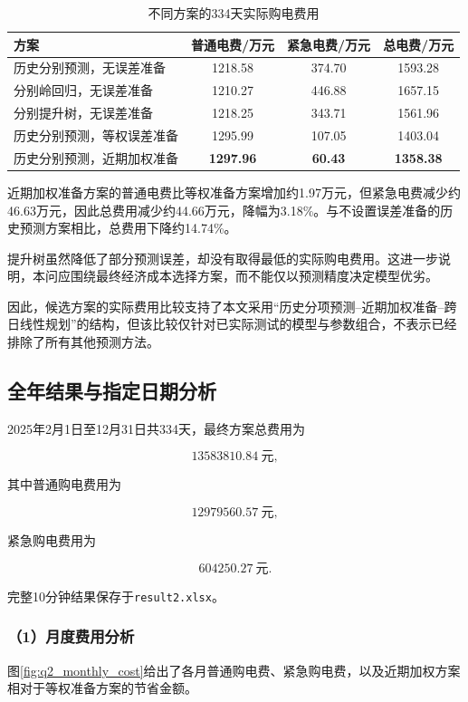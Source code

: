 \begin{table}[htbp]
\centering
\caption{不同方案的334天实际购电费用}
\label{tab:q2_model_compare}
\begin{tabular}{lccc}
\hline
方案 & 普通电费/万元 & 紧急电费/万元 & 总电费/万元 \\
\hline
历史分别预测，无误差准备
& 1218.58 & 374.70 & 1593.28 \\
分别岭回归，无误差准备
& 1210.27 & 446.88 & 1657.15 \\
分别提升树，无误差准备
& 1218.25 & 343.71 & 1561.96 \\
历史分别预测，等权误差准备
& 1295.99 & 107.05 & 1403.04 \\
历史分别预测，近期加权准备
& \textbf{1297.96} & \textbf{60.43} & \textbf{1358.38} \\
\hline
\end{tabular}
\end{table}

近期加权准备方案的普通电费比等权准备方案增加约1.97万元，但紧急电费减少约46.63万元，因此总费用减少约44.66万元，降幅为3.18\%。与不设置误差准备的历史预测方案相比，总费用下降约14.74\%。

提升树虽然降低了部分预测误差，却没有取得最低的实际购电费用。这进一步说明，本问应围绕最终经济成本选择方案，而不能仅以预测精度决定模型优劣。

因此，候选方案的实际费用比较支持了本文采用“历史分项预测--近期加权准备--跨日线性规划”的结构，但该比较仅针对已实际测试的模型与参数组合，不表示已经排除了所有其他预测方法。


\subsection{全年结果与指定日期分析}

2025年2月1日至12月31日共334天，最终方案总费用为

\[
\boxed{13583810.84\ \mathrm{元}},
\]

其中普通购电费用为

\[
12979560.57\ \mathrm{元},
\]

紧急购电费用为

\[
604250.27\ \mathrm{元}.
\]

完整10分钟结果保存于\texttt{result2.xlsx}。


\subsubsection*{（1）月度费用分析}

图\ref{fig:q2_monthly_cost}给出了各月普通购电费、紧急购电费，以及近期加权方案相对于等权准备方案的节省金额。

